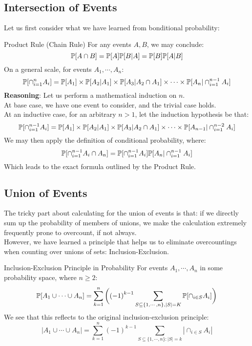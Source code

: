 \subsection{Intersection of Events}
Let us first consider what we have learned from bonditional probability:
\begin{ln-theorem}{Product Rule (Chain Rule)}{}
    For any events $A, B$, we may conclude:
    \[\P[A \cap B] = \P[A] \P[B | A] = \P[B] \P[A | B]\]
    On a general scale, for events $A_1, \cdots, A_n$:
    \[\P[\cap_{i = 1}^n A_i] = \P[A_1] \times \P[A_2 | A_1] \times \P[A_3 | A_2 \cap A_1] \times \cdots \times \P[A_n | \cap_{i = 1}^{n-1} A_i]\]
    \tcblower
    \textbf{Reasoning}: Let us perform a mathematical induction on $n$. \\
    At base case, we have one event to consider, and the trivial case holds. \\
    At an inductive case, for an arbitrary $n > 1$, let the induction hypothesis be that:
    \[\P[\cap_{i = 1}^{n - 1} A_i] = \P[A_1] \times \P[A_2 | A_1] \times \P[A_3 | A_2 \cap A_1] \times \cdots \times \P[A_{n - 1} | \cap_{i = 1}^{n - 2} A_i]\]
    We may then apply the definition of conditional probability, where:
    \[\P[\cap_{i = 1}^{n - 1} A_i \cap A_n] = \P[\cap_{i = 1}^{n - 1} A_i] \P[A_n | \cap_{i = 1}^{n - 1} A_i]\]
    Which leads to the exact formula outlined by the Product Rule.
\end{ln-theorem}

\subsection{Union of Events}
The tricky part about calculating for the union of events is that: if we directly sum up the probability of members of unions, we make the calculation extremely frequently prone to overcount, if not always. \\
However, we have learned a principle that helps us to eliminate overcountings when counting over unions of sets: Inclusion-Exclusion.
\begin{ln-define}{Inclusion-Exclusion Principle in Probability}{}
    For events $A_1, \cdots, A_n$ in some probability space, where $n \geq 2$:
    \[\P[A_1 \cup \cdots \cup A_n] = \sum_{k = 1}^n \bigg({(-1)}^{k - 1} \sum_{S \subseteq \{1, \cdots, n\}, |S| = K} \P[\cap_{i \in S} A_i] \bigg)\]
    We see that this reflects to the original inclusion-exclusion principle:
    \[|A_1 \cup \cdots \cup A_n| = \sum_{k = 1}^n {(-1)}^{k - 1} \sum_{S \subseteq \{1, \cdots, n\}:|S| = k} |\cap_{i \in S}A_i|\]
\end{ln-define}

